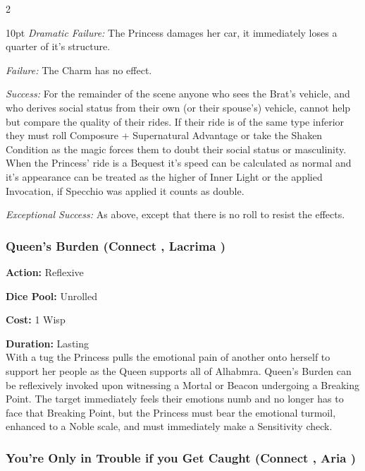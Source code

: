 \begin{multicols}{2}
\begin{myindentpar}{10pt} \emph{Dramatic Failure:} The Princess damages her car, it immediately loses a quarter of it's structure. 
   
    \emph{Failure:} The Charm has no effect.
	
    \emph{Success:} For the remainder of the scene anyone who sees the Brat's vehicle, and who derives social status from their own (or their spouse's) vehicle, cannot help but compare the quality of their rides. If their ride is of the same type inferior they must roll Composure + Supernatural Advantage or take the Shaken Condition as the magic forces them to doubt their social status or masculinity. When the Princess' ride is a Bequest it's speed can be calculated as normal and it's appearance can be treated as the higher of Inner Light or the applied Invocation, if Specchio was applied it counts as double.
	
    \emph{Exceptional Success:} As above, except that there is no roll to resist the effects.\end{myindentpar}

\subsubsection*{Queen's Burden (Connect \textbullet\textbullet, Lacrima \textbullet\textbullet)}

\noindent \textbf{Action:} Reflexive

\noindent \textbf{Dice Pool:} Unrolled

\noindent \textbf{Cost:} 1 Wisp

\noindent \textbf{Duration:} Lasting \\

\noindent With a tug the Princess pulls the emotional pain of another onto herself to support her people as the Queen supports all of Alhabmra. Queen's Burden can be reflexively invoked upon witnessing a Mortal or Beacon undergoing a Breaking Point. The target immediately feels their emotions numb and no longer has to face that Breaking Point, but the Princess must bear the emotional turmoil, enhanced to a Noble scale, and must immediately make a Sensitivity check. 
	
\subsubsection*{You're Only in Trouble if you Get Caught (Connect \textbullet\textbullet, Aria \textbullet\textbullet\textbullet)}


\end{multicols}
